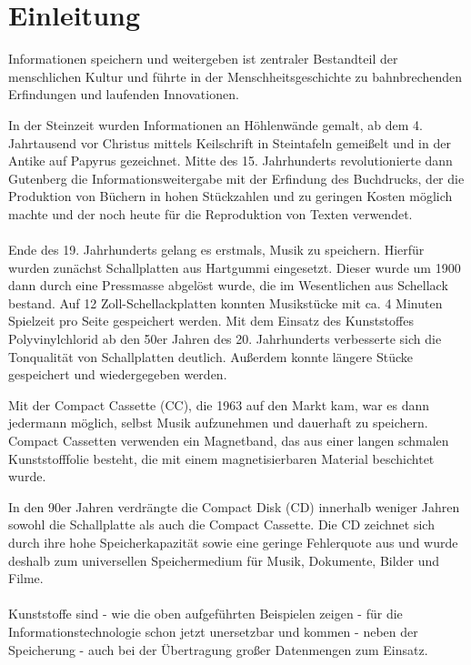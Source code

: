 \section{Einleitung}


Informationen speichern und weitergeben ist zentraler Bestandteil der menschlichen Kultur und führte 
in der Menschheitsgeschichte zu bahnbrechenden Erfindungen und laufenden Innovationen.

In der Steinzeit wurden Informationen an Höhlenwände gemalt, ab dem 4. Jahrtausend vor Christus
mittels  Keilschrift in Steintafeln gemeißelt und in der Antike auf Papyrus gezeichnet. Mitte
des 15. Jahrhunderts revolutionierte dann Gutenberg die Informationsweitergabe mit der Erfindung des
Buchdrucks, der die Produktion von Büchern in hohen Stückzahlen und zu geringen Kosten möglich
machte und der noch heute für die Reproduktion von Texten verwendet.

\paragraph{}
Ende des 19. Jahrhunderts gelang es erstmals, Musik zu speichern. Hierfür wurden zunächst
Schallplatten aus Hartgummi eingesetzt. Dieser wurde um 1900 dann durch eine Pressmasse abgelöst
wurde, die im Wesentlichen aus Schellack bestand. Auf 12 Zoll-Schellackplatten konnten Musikstücke
mit ca. 4 Minuten Spielzeit pro Seite gespeichert werden. Mit dem Einsatz des Kunststoffes
Polyvinylchlorid ab den 50er Jahren des 20. Jahrhunderts verbesserte sich die Tonqualität von
Schallplatten deutlich. Außerdem konnte längere Stücke gespeichert und wiedergegeben werden. 

Mit der Compact Cassette (CC), die 1963 auf den Markt kam, war es dann jedermann möglich, selbst
Musik aufzunehmen und dauerhaft zu speichern. Compact Cassetten verwenden ein Magnetband, das aus
einer langen schmalen Kunststofffolie besteht, die mit einem magnetisierbaren Material beschichtet wurde. 

In den 90er Jahren verdrängte  die Compact Disk (CD) innerhalb weniger Jahren sowohl die
Schallplatte als auch die Compact Cassette. Die CD zeichnet sich durch ihre hohe Speicherkapazität
sowie eine geringe Fehlerquote aus und wurde deshalb zum universellen Speichermedium für Musik, Dokumente,
Bilder und Filme.

\paragraph{}
Kunststoffe sind - wie die oben aufgeführten Beispielen zeigen - für die Informationstechnologie
schon jetzt unersetzbar und kommen - neben der Speicherung - auch bei der Übertragung großer
Datenmengen zum Einsatz.

